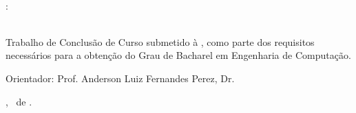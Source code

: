 \documentclass{ufscThesis} %
\begin{document}
\capa  

\begin{titlepage}
	\vfill
	\begin{center}
		\ABNTautordata \\[5cm]
		
		\tituloformat{\ABNTtitulodata}: \\
		\tituloformat{\subtitulodata} \\[1cm]
		
		\hspace{.45\textwidth} %
		\begin{minipage}{.5\textwidth}
			\begin{espacosimples}
				
				Trabalho de Conclusão de Curso submetido à \ABNTinstituicaodata,
				como parte dos requisitos necessários para a obtenção do Grau de
				Bacharel em Engenharia de Computação.
				
				Orientador: Prof. Anderson Luiz Fernandes Perez, Dr.
			\end{espacosimples}
		\end{minipage}
		\vfill \localformat \ABNTlocaldata, \mesdata\ de \anodata.
	\end{center}
	\vspace{1cm}
\end{titlepage}

\paginadedicatoria
\paginaagradecimento
\paginaepigrafe
\paginaresumo
\paginaabstract
\listadefiguras %
\listadetabelas 
\listadeabreviaturas
{%
	\renewcommand{\figurename}{}%
	\let\oldnumberline\numberline%
	\renewcommand{\numberline}{\listingname~\oldnumberline}%
	\listoflisting%
}
\sumario





\end{document}

